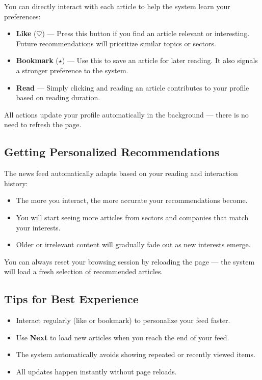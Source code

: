 You can directly interact with each article to help the system learn your preferences:

\begin{itemize}
  \item \textbf{Like} (\(\heartsuit\)) — Press this button if you find an article relevant or interesting.  
        Future recommendations will prioritize similar topics or sectors.
  \item \textbf{Bookmark} (\(\star\)) — Use this to save an article for later reading.  
        It also signals a stronger preference to the system.
  \item \textbf{Read} — Simply clicking and reading an article contributes to your profile based on reading duration.
\end{itemize}

All actions update your profile automatically in the background --- there is no need to refresh the page.

\subsection{Getting Personalized Recommendations}

The news feed automatically adapts based on your reading and interaction history:
\begin{itemize}
  \item The more you interact, the more accurate your recommendations become.
  \item You will start seeing more articles from sectors and companies that match your interests.
  \item Older or irrelevant content will gradually fade out as new interests emerge.
\end{itemize}

You can always reset your browsing session by reloading the page --- the system will load a fresh selection of recommended articles.

\subsection{Tips for Best Experience}

\begin{itemize}
  \item Interact regularly (like or bookmark) to personalize your feed faster.
  \item Use \textbf{Next} to load new articles when you reach the end of your feed.
  \item The system automatically avoids showing repeated or recently viewed items.
  \item All updates happen instantly without page reloads.
\end{itemize}


